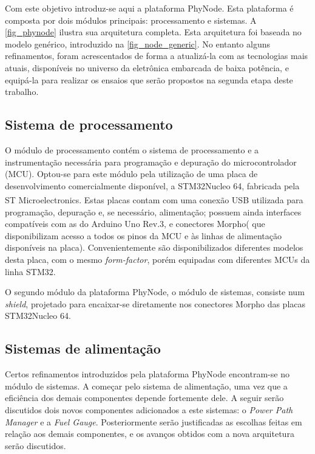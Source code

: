 \documentclass[
	12pt,				%
	openright,			%
	oneside,
	a4paper,			%
	english,			%
	french,				%
	spanish,			%
	brazil				%
	]{abntex2}
\begin{document}
Com este objetivo introduz-se aqui a plataforma PhyNode. Esta plataforma é composta por dois módulos principais: processamento e sistemas. A \autoref{fig_phynode} ilustra sua arquitetura completa. Esta arquitetura foi baseada no modelo genérico, introduzido na \autoref{fig_node_generic}. No entanto alguns refinamentos, foram acrescentados de forma a atualizá-la com as tecnologias mais atuais, disponíveis no universo da eletrônica embarcada de baixa potência, e equipá-la para realizar os ensaios que serão propostos na segunda etapa deste trabalho.

\subsection{Sistema de processamento}

O módulo de processamento contém o sistema de processamento e a instrumentação necessária para programação e depuração do microcontrolador (MCU). Optou-se para este módulo pela utilização de uma placa de desenvolvimento comercialmente disponível, a STM32Nucleo 64, fabricada pela ST\textsuperscript{\textregistered} Microelectronics. Estas placas contam com uma conexão USB utilizada para programação, depuração e, se necessário, alimentação; possuem ainda interfaces compatíveis com as do Arduino Uno Rev.3\texttrademark, e conectores Morpho\texttrademark ( que disponibilizam acesso a todos os pinos da MCU e às linhas de alimentação disponíveis na placa). Convenientemente são disponibilizados diferentes modelos desta placa, com o mesmo \textit{form-factor}, porém equipadas com diferentes MCUs da linha STM32\texttrademark.

O segundo módulo da plataforma PhyNode, o módulo de sistemas, consiste num \textit{shield}, projetado para encaixar-se diretamente nos conectores Morpho das placas STM32Nucleo 64.

\subsection{Sistemas de alimentação}

Certos refinamentos introduzidos pela plataforma PhyNode encontram-se no módulo de sistemas. A começar pelo sistema de alimentação, uma vez que a eficiência dos demais componentes depende fortemente dele. A seguir serão discutidos dois novos componentes adicionados a este sistemas: o \textit{Power Path Manager} e a \textit{Fuel Gauge}. Posteriormente serão justificadas as escolhas feitas em relação aos demais componentes, e os avanços obtidos com a nova arquitetura serão discutidos.
\end{document}
